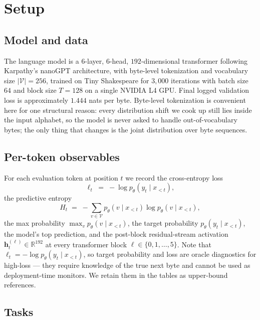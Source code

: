 \documentclass[11pt]{article}
\begin{document}
\section{Setup}

\subsection{Model and data}

The language model is a $6$-layer, $6$-head, $192$-dimensional transformer following Karpathy's nanoGPT architecture, with byte-level tokenization and vocabulary size $|\mathcal{V}|=256$, trained on Tiny Shakespeare for $3{,}000$ iterations with batch size $64$ and block size $T=128$ on a single NVIDIA L4 GPU. Final logged validation loss is approximately $1.444$ nats per byte. Byte-level tokenization is convenient here for one structural reason: every distribution shift we cook up still lies inside the input alphabet, so the model is never asked to handle out-of-vocabulary bytes; the only thing that changes is the joint distribution over byte sequences.

\subsection{Per-token observables}

For each evaluation token at position $t$ we record the cross-entropy loss
\begin{equation}
  \ell_t \;=\; -\log p_\theta\!\left(y_t \mid x_{<t}\right),
\end{equation}
the predictive entropy
\begin{equation}
  H_t \;=\; -\sum_{v \in \mathcal{V}} p_\theta(v \mid x_{<t}) \log p_\theta(v \mid x_{<t}),
\end{equation}
the max probability $\max_v p_\theta(v\mid x_{<t})$, the target probability $p_\theta(y_t\mid x_{<t})$, the model's top prediction, and the post-block residual-stream activation $\mathbf{h}_t^{(\ell)} \in \mathbb{R}^{192}$ at every transformer block $\ell \in \{0,1,\dots,5\}$. Note that $\ell_t = -\log p_\theta(y_t\mid x_{<t})$, so target probability and loss are oracle diagnostics for high-loss --- they require knowledge of the true next byte and cannot be used as deployment-time monitors. We retain them in the tables as upper-bound references.

\subsection{Tasks}
\end{document}
